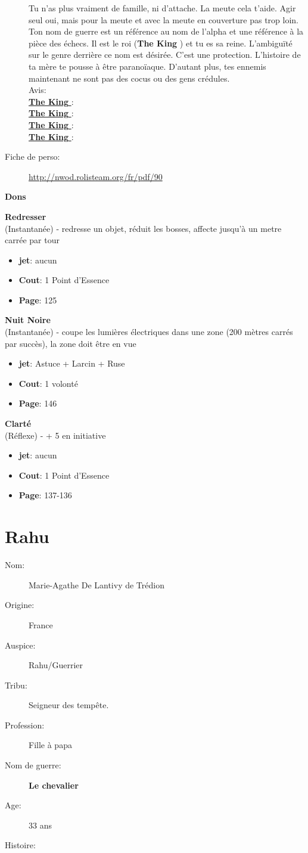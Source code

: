\documentclass[oneside,12pt]{book}
\newcommand\don[6]{
\textbf{#1} \\
(#6) - #2
\begin{itemize}
\item{ \textbf{jet}: #3}
\item{ \textbf{Cout}: #4}
\item{ \textbf{Page}: #5}
\end{itemize}
\vspace{0.5cm}
}
\newcommand{\King}{\textbf{The King} }
\newcommand{\Chevalier}{\textbf{Le chevalier} }
\begin{document}
\begin{flushleft}
\begin{description}
{Tu n'as plus vraiment de famille, ni d'attache. La meute cela t'aide. Agir seul oui, mais pour la meute et avec la meute en couverture pas trop loin.\\
Ton nom de guerre est un référence au nom de l'alpha et une référence à la pièce des échecs. Il est le roi (\King) et tu es sa reine. 
L'ambiguïté sur le genre derrière ce nom est désirée. C'est une protection. L'histoire de ta mère te pousse à être paranoïaque. D'autant plus, tes ennemis maintenant ne sont pas des cocus ou des gens crédules.\\
Avis:\\
\underline{\King} :\\
\underline{\King}: \\
\underline{\King} : \\
\underline{\King}: \\
}
\item[Fiche de perso:]{\href{http://nwod.rolisteam.org/fr/pdf/90}{http://nwod.rolisteam.org/fr/pdf/90}}
\end{description}
\clearpage
\textbf{\large Dons} 
\vspace{0.5cm}


\don{Redresser}{redresse un objet, réduit les bosses, affecte jusqu'à un metre carrée par tour}{aucun}{1 Point d'Essence}{125}{Instantanée}
\don{Nuit Noire}{coupe les lumières électriques dans une zone (200 mètres carrés par succès), la zone doit être en vue}{Astuce + Larcin + Ruse}{1 volonté}{146}{Instantanée}
\don{Clarté}{+ 5 en initiative}{aucun}{1 Point d'Essence}{137-136}{Réflexe}

\clearpage
\section{Rahu}
\begin{description}
\item[Nom:]{Marie-Agathe De Lantivy de Trédion}
\item[Origine:]{France}
\item[Auspice:]{Rahu/Guerrier}
\item[Tribu:]{Seigneur des tempête.}
\item[Profession:]{Fille à papa}
\item[Nom de guerre:]{\Chevalier}
\item[Age:]{33 ans}
\item[Histoire:]{

}
\end{description}
\end{flushleft}
\end{document}
